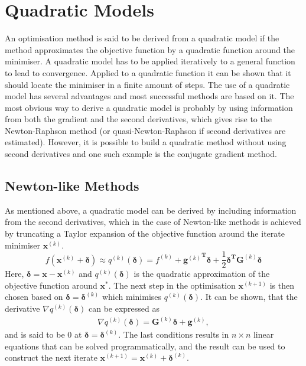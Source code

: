 \section{Quadratic Models}
\label{sec:QuadraticModels}

An optimisation method is said to be derived from a quadratic model if the
method approximates the objective function by a quadratic function around the
minimiser. A quadratic model has to be applied iteratively to a general
function to lead to convergence. Applied to a quadratic function it can be
shown that it should locate the minimiser in a finite amount of steps. The use
of a quadratic model has several advantages and most successful methods are
based on it. The most obvious way to derive a quadratic model is probably by
using information from both the gradient and the second derivatives, which
gives rise to the Newton-Raphson method (or quasi-Newton-Raphson if second
derivatives are estimated). However, it is possible to build a quadratic method
without using second derivatives and one such example is the conjugate gradient
method. 

\subsection{Newton-like Methods}
\label{sec:NewtonlikeMethods}

As mentioned above, a quadratic model can be derived by including information
from the second derivatives, which in the case of Newton-like methods is
achieved by truncating a Taylor expansion of the objective function around the
iterate minimiser $\mathbf{x}^{(k)}$.
%
\begin{equation}
    f\left(\mathbf{x}^{(k)}+\bm{\delta}\right)\approx 
        q^{(k)}(\bm{\delta})=
        f^{(k)} + {\mathbf{g}^{(k)}}^\mathbf{T}\bm{\delta}
        + \frac{1}{2}\bm{\delta^T}\mathbf{G}^{(k)}\bm{\delta}\label{eqn:TaylorNewton}
\end{equation}
% 
Here, $\bm{\delta}=\mathbf{x}-\mathbf{x}^{(k)}$ and $q^{(k)}(\bm{\delta})$ is
the quadratic approximation of the objective function around $\mathbf{x^*}$.
The next step in the optimisation $\mathbf{x}^{(k+1)}$ is then chosen based on
$\bm{\delta}=\bm{\delta}^{(k)}$ which minimises $q^{(k)}(\bm{\delta})$. It can
be shown, that the derivative $\nabla q^{(k)}(\bm{\delta})$ can be
expressed as
%
\begin{align}
    \nabla q^{(k)}(\bm{\delta})=\mathbf{G}^{(k)}\bm{\delta}+\mathbf{g}^{(k)},\label{eqn:QuadraticAprroximationDerivative}
\end{align}
%
and is said to be $0$ at $\bm{\delta}=\bm{\delta}^{(k)}$. The last conditions
results in $n\times n$ linear equations that can be solved programmatically,
and the result can be used to construct the next iterate
$\mathbf{x}^{(k+1)}=\mathbf{x}^{(k)}+\bm{\delta}^{(k)}$.

